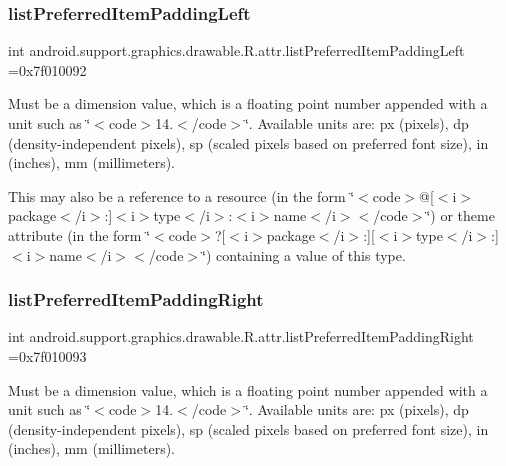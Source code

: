 \subsubsection{\texorpdfstring{list\+Preferred\+Item\+Padding\+Left}{listPreferredItemPaddingLeft}}
{\footnotesize\ttfamily int android.\+support.\+graphics.\+drawable.\+R.\+attr.\+list\+Preferred\+Item\+Padding\+Left =0x7f010092\hspace{0.3cm}{\ttfamily [static]}}

Must be a dimension value, which is a floating point number appended with a unit such as \char`\"{}$<$code$>$14.\+5sp$<$/code$>$\char`\"{}. Available units are\+: px (pixels), dp (density-\/independent pixels), sp (scaled pixels based on preferred font size), in (inches), mm (millimeters). 

This may also be a reference to a resource (in the form \char`\"{}$<$code$>$@\mbox{[}$<$i$>$package$<$/i$>$\+:\mbox{]}$<$i$>$type$<$/i$>$\+:$<$i$>$name$<$/i$>$$<$/code$>$\char`\"{}) or theme attribute (in the form \char`\"{}$<$code$>$?\mbox{[}$<$i$>$package$<$/i$>$\+:\mbox{]}\mbox{[}$<$i$>$type$<$/i$>$\+:\mbox{]}$<$i$>$name$<$/i$>$$<$/code$>$\char`\"{}) containing a value of this type. \mbox{\label{classandroid_1_1support_1_1graphics_1_1drawable_1_1R_1_1attr_ab19c3cac3672677eb3d50b1d9e22c771}} 
\subsubsection{\texorpdfstring{list\+Preferred\+Item\+Padding\+Right}{listPreferredItemPaddingRight}}
{\footnotesize\ttfamily int android.\+support.\+graphics.\+drawable.\+R.\+attr.\+list\+Preferred\+Item\+Padding\+Right =0x7f010093\hspace{0.3cm}{\ttfamily [static]}}

Must be a dimension value, which is a floating point number appended with a unit such as \char`\"{}$<$code$>$14.\+5sp$<$/code$>$\char`\"{}. Available units are\+: px (pixels), dp (density-\/independent pixels), sp (scaled pixels based on preferred font size), in (inches), mm (millimeters). 

